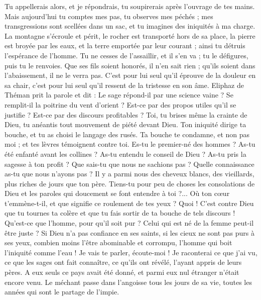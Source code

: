 \begin{multicols}{2}
Tu appellerais alors, et je répondrais, tu soupirerais après l'ouvrage de tes mains.
Mais aujourd'hui tu comptes mes pas, tu observes mes péchés ;
mes transgressions sont scellées dans un sac, et tu imagines des iniquités à ma charge.
La montagne s'écroule et périt, le rocher est transporté hors de sa place,
la pierre est broyée par les eaux, et la terre emportée par leur courant ; ainsi tu détruis l'espérance de l'homme.
Tu ne cesses de l'assaillir, et il s'en va ; tu le défigures, puis tu le renvoies.
Que ses fils soient honorés, il n'en sait rien ; qu'ils soient dans l'abaissement, il ne le verra pas.
C'est pour lui seul qu'il éprouve de la douleur en sa chair, c'est pour lui seul qu'il ressent de la tristesse en son âme.
\VerseOne{}Eliphaz de Théman prit la parole et dit :
Le sage répond-il par une science vaine ? Se remplit-il la poitrine du vent d'orient ?
Est-ce par des propos utiles qu'il se justifie ? Est-ce par des discours profitables ?
Toi, tu brises même la crainte de Dieu, tu anéantis tout mouvement de piété devant Dieu.
Ton iniquité dirige ta bouche, et tu as choisi le langage des rusés.
Ta bouche te condamne, et non pas moi ; et tes lèvres témoignent contre toi.
Es-tu le premier-né des hommes ? As-tu été enfanté avant les collines ?
As-tu entendu le conseil de Dieu ? As-tu pris la sagesse à ton profit ?
Que sais-tu que nous ne sachions pas ? Quelle connaissance as-tu que nous n'ayons pas ?
Il y a parmi nous des cheveux blancs, des vieillards, plus riches de jours que ton père.
Tiens-tu pour peu de choses les consolations de Dieu et les paroles qui doucement se font entendre à toi ?...
Où ton cœur t'emmène-t-il, et que signifie ce roulement de tes yeux ?
Quoi ! C'est contre Dieu que tu tournes ta colère et que tu fais sortir de ta bouche de tels discours !
Qu'est-ce que l'homme, pour qu'il soit pur ? Celui qui est né de la femme peut-il être juste ?
Si Dieu n'a pas confiance en ses saints, si les cieux ne sont pas purs à ses yeux,
combien moins l'être abominable et corrompu, l'homme qui boit l'iniquité comme l'eau !
Je vais te parler, écoute-moi ! Je raconterai ce que j'ai vu,
ce que les sages ont fait connaître, ce qu'ils ont révélé, l'ayant appris de leurs pères.
A eux seuls ce pays avait été donné, et parmi eux nul étranger n'était encore venu.
Le méchant passe dans l'angoisse tous les jours de sa vie, toutes les années qui sont le partage de l'impie.

\end{multicols}
